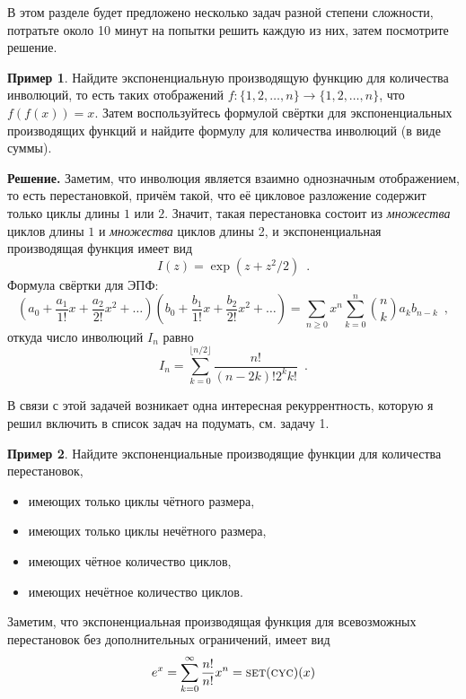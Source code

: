 \documentclass[a5paper]{article}
\theoremstyle{definition}
\newtheorem{example}{Пример}
\begin{document}
В этом разделе будет предложено несколько задач разной степени сложности, 
потратьте около 10 минут на попытки решить каждую из них, затем посмотрите 
решение.


\begin{example}   Найдите экспоненциальную производящую функцию для количества 
инволюций, то есть таких отображений \( f \colon \{ 1, 2, \ldots, n \} \to \{ 
1, 2, \ldots, n \} \), что \( f(f(x)) = x \). Затем воспользуйтесь формулой 
свёртки для экспоненциальных производящих функций и найдите формулу для 
количества инволюций (в виде суммы).
\end{example}

\textbf{Решение.} Заметим, что инволюция является взаимно однозначным 
отображением, то есть перестановкой, причём такой, что её цикловое разложение 
содержит только циклы длины \( 1 \) или \( 2 \). Значит, такая перестановка 
состоит из \textit{множества} циклов длины \( 1 \) и \textit{множества} циклов 
длины 2, и экспоненциальная производящая функция имеет вид
\[
	I(z) = \exp \left(
		z + z^2/2
	\right) \enspace .
\]
Формула свёртки для ЭПФ:
\[
	\left(a_0 + \dfrac{a_1}{1!}x + \dfrac{a_2}{2!}x^2 + \ldots\right)
	\left(b_0 + \dfrac{b_1}{1!}x + \dfrac{b_2}{2!}x^2 + \ldots\right)	
= \sum_{n \geq 0} x^n \sum_{k = 0}^{n}{n \choose k} a_{k} b_{n-k} \enspace ,
\]
откуда число инволюций \( I_n \) равно
\[
	I_n = \sum_{k=0}^{\lfloor n/2 \rfloor}\dfrac{n!}{(n-2k)!2^k k!} \enspace .
\]

В связи с этой задачей возникает одна интересная рекуррентность, которую я решил
включить в список задач на подумать, см. задачу 1.

\begin{example}   Найдите экспоненциальные производящие функции для количества 
перестановок,
\begin{itemize}
	\item имеющих только циклы чётного размера,
	\item имеющих только циклы нечётного размера,
	\item имеющих чётное количество циклов,
	\item имеющих нечётное количество циклов.
\end{itemize}     
\end{example}

Заметим, что экспоненциальная производящая функция для всевозможных перестановок
без дополнительных ограничений, имеет вид
\begin{equation*}
    e^x = \sum_{k=0}^{\infty} \dfrac{n!}{n!}x^n =
\text{\textsc{set}}(\text{\textsc{cyc}})(x)
\end{equation*}
\end{document}
